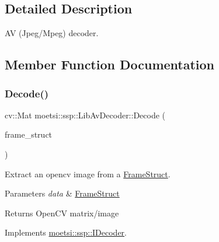 \subsection{Detailed Description}
AV (Jpeg/\+Mpeg) decoder. 

\subsection{Member Function Documentation}
\mbox{\label{classmoetsi_1_1ssp_1_1LibAvDecoder_a4206a4581de1b93d6c6a0835e8cf4ac8}} 
\subsubsection{\texorpdfstring{Decode()}{Decode()}}
{\footnotesize\ttfamily cv\+::\+Mat moetsi\+::ssp\+::\+Lib\+Av\+Decoder\+::\+Decode (\begin{DoxyParamCaption}\item[{\hyperlink{structmoetsi_1_1ssp_1_1FrameStruct}{Frame\+Struct} \&}]{frame\+\_\+struct }\end{DoxyParamCaption})\hspace{0.3cm}{\ttfamily [virtual]}}



Extract an opencv image from a \hyperlink{structmoetsi_1_1ssp_1_1FrameStruct}{Frame\+Struct}. 


\begin{DoxyParams}{Parameters}
{\em data} & \hyperlink{structmoetsi_1_1ssp_1_1FrameStruct}{Frame\+Struct} \\
\hline
\end{DoxyParams}
\begin{DoxyReturn}{Returns}
Open\+CV matrix/image 
\end{DoxyReturn}


Implements \hyperlink{classmoetsi_1_1ssp_1_1IDecoder_a1c06604dc4107d3668a4e791c13cc063}{moetsi\+::ssp\+::\+I\+Decoder}.

\mbox{\label{classmoetsi_1_1ssp_1_1LibAvDecoder_a41c94bd7fa9576902ea0a6e95e59d93e}} 
